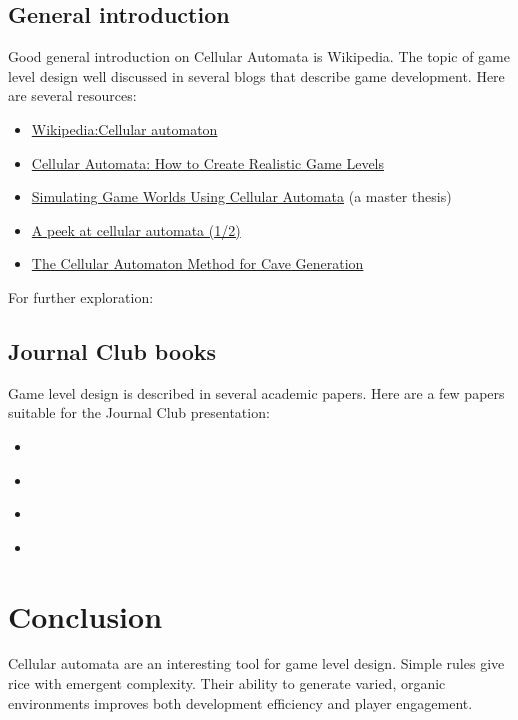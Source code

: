 \documentclass{article}
\begin{document}
\subsection{General introduction}
Good general introduction on Cellular Automata is Wikipedia. The topic of game level design well discussed in several blogs that describe game development. Here are several resources:
\begin{itemize}
    \item \href{https://en.wikipedia.org/wiki/Cellular_automaton}{Wikipedia:Cellular automaton}
    \item \href{https://medium.com/@yvanscher/cellular-automata-how-to-create-realistic-worlds-for-your-game-2a9ec35f5ba9}{Cellular Automata: How to Create Realistic Game Levels}
    \item \href{https://is.muni.cz/th/w12aw/SimulatingWorldsCA.pdf}{Simulating Game Worlds Using Cellular Automata} (a master thesis)
    \item \href{https://medium.com/nerd-for-tech/a-peek-at-cellular-automata-1-2-ee0bf60204fa}{A peek at cellular automata (1/2)}
    \item \href{https://www.jeremykun.com/2012/07/29/the-cellular-automaton-method-for-cave-generation/}{The Cellular Automaton Method for Cave Generation}
\end{itemize}


For further exploration:
\subsection{Journal Club books}
Game level design is described in several academic papers. Here are a few papers suitable for the Journal Club presentation:
\begin{itemize}
 \item \textcite{Adams2017_game_level}
 \item \textcite{Earle2022_game_level}
  \item \textcite{Johnson2010_game_level}
\item \textcite{Pech2016_game_level}
\end{itemize}



\section{Conclusion}

Cellular automata are an interesting tool for game level design.   Simple rules give rice with emergent complexity. Their ability to generate varied, organic environments improves both development efficiency and player engagement.

\printbibliography
\end{document}
